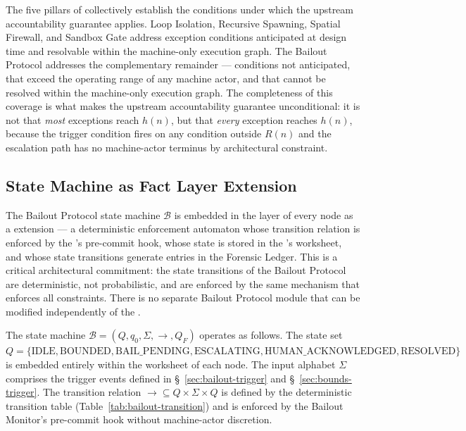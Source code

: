 The five pillars of \bxthree{} collectively establish the conditions under which the upstream accountability guarantee applies. Loop Isolation, Recursive Spawning, Spatial Firewall, and Sandbox Gate address exception conditions anticipated at design time and resolvable within the machine-only execution graph. The Bailout Protocol addresses the complementary remainder — conditions not anticipated, that exceed the operating range of any machine actor, and that cannot be resolved within the machine-only execution graph. The completeness of this coverage is what makes the upstream accountability guarantee unconditional: it is not that \emph{most} exceptions reach $h(n)$, but that \emph{every} exception reaches $h(n)$, because the trigger condition fires on any condition outside $R(n)$ and the escalation path has no machine-actor terminus by architectural constraint.

\subsection{State Machine as Fact Layer Extension}
\label{sec:state-machine-extension}

The Bailout Protocol state machine $\mathcal{B}$ is embedded in the \fact{} layer of every \bxthree{} node as a \fact{} extension — a deterministic enforcement automaton whose transition relation is enforced by the \fact's pre-commit hook, whose state is stored in the \fact's worksheet, and whose state transitions generate entries in the Forensic Ledger. This is a critical architectural commitment: the state transitions of the Bailout Protocol are deterministic, not probabilistic, and are enforced by the same mechanism that enforces all \fact{} constraints. There is no separate Bailout Protocol module that can be modified independently of the \fact{}.

The state machine $\mathcal{B} = (Q, q_0, \Sigma, \rightarrow, Q_F)$ operates as follows. The state set $Q = \{\text{IDLE}, \text{BOUNDED}, \text{BAIL\_PENDING}, \text{ESCALATING}, \text{HUMAN\_ACKNOWLEDGED}, \text{RESOLVED}\}$ is embedded entirely within the \fact{} worksheet of each node. The input alphabet $\Sigma$ comprises the trigger events defined in \S~\ref{sec:bailout-trigger} and \S~\ref{sec:bounds-trigger}. The transition relation $\rightarrow \subseteq Q \times \Sigma \times Q$ is defined by the deterministic transition table (Table~\ref{tab:bailout-transition}) and is enforced by the Bailout Monitor's pre-commit hook without machine-actor discretion.

